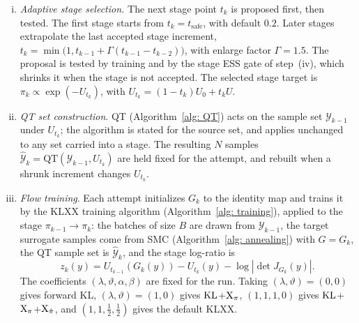 \documentclass{article}
\begin{document}
\begin{enumerate}[(i)]
\item \emph{Adaptive stage selection.} The next stage point $t_k$ is proposed first, then tested. The first stage starts from $t_k=t_{\mathrm{safe}}$, with default $0.2$. Later stages extrapolate the last accepted stage increment, $t_k=\min\bigl(1,t_{k-1}+\Gamma(t_{k-1}-t_{k-2})\bigr)$, with enlarge factor $\Gamma=1.5$. The proposal is tested by training and by the stage ESS gate of step~(iv), which shrinks it when the stage is not accepted. The selected stage target is $\pi_k\propto\exp(-U_{t_k})$, with $U_{t_k}=(1-t_k)U_0+t_kU$.

\item \emph{QT set construction}. QT (Algorithm~\ref{alg: QT}) acts on the sample set $\mathcal Y_{k-1}$ under $U_{t_k}$; the algorithm is stated for the source set, and applies unchanged to any set carried into a stage. The resulting $N$ samples $\hat{\mathcal Y}_k=\mathrm{QT}(\mathcal Y_{k-1},U_{t_k})$ are held fixed for the attempt, and rebuilt when a shrunk increment changes $U_{t_k}$.

\item \emph{Flow training}. Each attempt initializes $G_k$ to the identity map and trains it by the KLXX training algorithm (Algorithm~\ref{alg: training}), applied to the stage $\pi_{k-1}\to\pi_k$: the batches of size $B$ are drawn from $\mathcal Y_{k-1}$, the target surrogate samples come from SMC (Algorithm~\ref{alg: annealing}) with $G=G_k$, the QT sample set is $\hat{\mathcal Y}_k$, and the stage log-ratio is
\begin{equation*}
    z_k(y) = U_{t_{k-1}}(G_k(y)) - U_{t_k}(y) - \log|\det J_{G_k}(y)|.
\end{equation*}
The coefficients $(\lambda,\vartheta,\alpha,\beta)$ are fixed for the run. Taking $(\lambda,\vartheta)=(0,0)$ gives forward KL, $(\lambda,\vartheta)=(1,0)$ gives $\mathrm{KL}$+$\mathrm{X}_{\pi}$, $(1,1,1,0)$ gives $\mathrm{KL}$+$\mathrm{X}_\pi$+$\mathrm{X}_{\hat\pi}$, and $(1,1,\frac12,\frac12)$ gives the default KLXX.


\end{enumerate}
\end{document}
